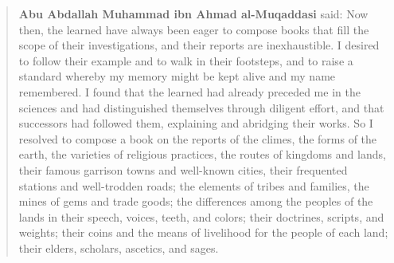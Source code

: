 \documentclass[11pt,a4paper]{article}
\begin{document}
{\small\arabicfont
{}}

\bigskip

\begin{quote}
\small
\textbf{Abu Abdallah Muhammad ibn Ahmad al-Muqaddasi} said: Now then, the learned have always been eager to compose books that fill the scope of their investigations, and their reports are inexhaustible. I desired to follow their example and to walk in their footsteps, and to raise a standard whereby my memory might be kept alive and my name remembered. I found that the learned had already preceded me in the sciences and had distinguished themselves through diligent effort, and that successors had followed them, explaining and abridging their works. So I resolved to compose a book on the reports of the climes, the forms of the earth, the varieties of religious practices, the routes of kingdoms and lands, their famous garrison towns and well-known cities, their frequented stations and well-trodden roads; the elements of tribes and families, the mines of gems and trade goods; the differences among the peoples of the lands in their speech, voices, teeth, and colors; their doctrines, scripts, and weights; their coins and the means of livelihood for the people of each land; their elders, scholars, ascetics, and sages.
\end{quote}

\clearpage

\end{document}
